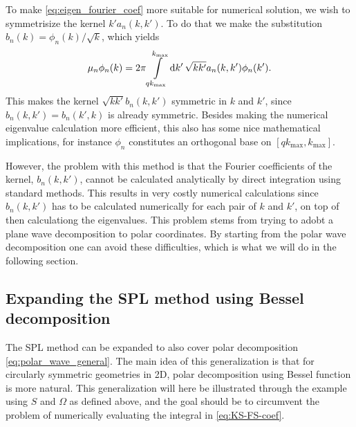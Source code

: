 \documentclass[11pt,a4paper, 
swedish,english %
]{article}
\begin{document}
To make \eqref{eq:eigen_fourier_coef} more suitable for numerical
solution, we wish to symmetrisize the kernel $k'a_n(k, k')$. To do
that we make the substitution $b_n(k)=\phi_n(k)/\sqrt{k}$, which
yields 
\begin{equation}\label{eq:eig-n}
\mu_n \phi_n(k) = 2\pi\int_{qk_{\max}}^{k_{\max}}\rd{k'}\,
\sqrt{kk'}a_n(k, k') \phi_n(k').
\end{equation}
This makes the kernel $\sqrt{kk'}b_n(k, k')$ symmetric in $k$ and
$k'$, since $b_n(k, k')=b_n(k', k)$ is already symmetric. Besides
making the numerical eigenvalue calculation more efficient, this also
has some nice mathematical implications, for instance $\phi_n$
constitutes an orthogonal base on $[qk_{\max}, k_{\max}]$.

However, the problem with this method is that the Fourier coefficients
of the kernel, $b_n(k, k')$, cannot be calculated analytically by
direct integration using standard methods. This results in very costly
numerical calculations since $b_n(k, k')$ has to be calculated
numerically for each pair of $k$ and $k'$, on top of then calculationg
the eigenvalues. 
This problem stems from trying to adobt a plane wave decomposition to
polar coordinates. By starting from the polar wave decomposition one
can avoid these difficulties, which is what we will do in the
following section. 


\subsection{Expanding the SPL method using Bessel decomposition}
The SPL method can be expanded to also cover polar decomposition
\eqref{eq:polar_wave_general}. The main idea of this generalization is
that for circularly symmetric geometries in 2D, polar decomposition
using Bessel function is more natural. 
This generalization will here be illustrated through the example using
$S$ and $\Omega$ as defined above, and the goal should be to
circumvent the problem of numerically evaluating the integral in 
\eqref{eq:KS-FS-coef}.
\end{document}
